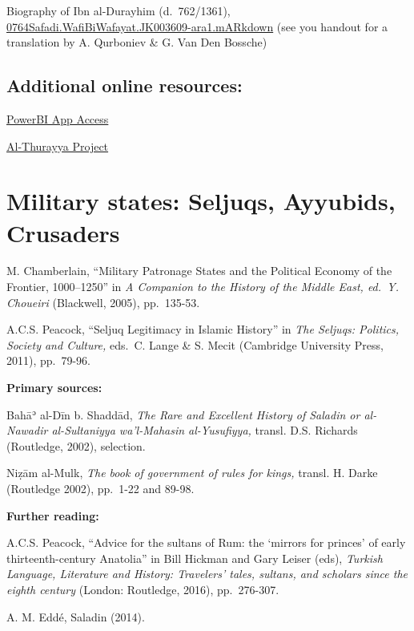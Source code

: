 \documentclass[
]{book}
\begin{document}
Biography of Ibn al-Durayhim (d.~762/1361), \href{https://raw.githubusercontent.com/OpenITI/0775AH/master/data/0764Safadi/0764Safadi.WafiBiWafayat/0764Safadi.WafiBiWafayat.JK003609-ara1.mARkdown}{0764Safadi.WafiBiWafayat.JK003609-ara1.mARkdown} (see you handout for a translation by A. Qurboniev \& G. Van Den Bossche)

\hypertarget{additional-online-resources}{%
\section{Additional online resources:}\label{additional-online-resources}}

\href{https://tinyurl.com/AuthorsArabic}{PowerBI App Access}

\href{https://althurayya.github.io/\#searchPane}{Al-Thurayya Project}

\hypertarget{military-states-seljuqs-ayyubids-crusaders}{%
\chapter{Military states: Seljuqs, Ayyubids, Crusaders}\label{military-states-seljuqs-ayyubids-crusaders}}

M. Chamberlain, ``Military Patronage States and the Political Economy of the Frontier, 1000--1250'' in \emph{A Companion to the History of the Middle East, ed.~Y. Choueiri} (Blackwell, 2005), pp.~135-53.

A.C.S. Peacock, ``Seljuq Legitimacy in Islamic History'' in \emph{The Seljuqs: Politics, Society and Culture,} eds.~C. Lange \& S. Mecit (Cambridge University Press, 2011), pp.~79-96.

\textbf{Primary sources:}

Bahāʾ al-Dīn b. Shaddād, \emph{The Rare and Excellent History of Saladin or al-Nawadir al-Sultaniyya wa'l-Mahasin al-Yusufiyya,} transl. D.S. Richards (Routledge, 2002), selection.

Niẓām al-Mulk, \emph{The book of government of rules for kings,} transl. H. Darke (Routledge 2002), pp.~1-22 and 89-98.

\textbf{Further reading:}

A.C.S. Peacock, ``Advice for the sultans of Rum: the `mirrors for princes' of early thirteenth-century Anatolia'' in Bill Hickman and Gary Leiser (eds), \emph{Turkish Language, Literature and History: Travelers' tales, sultans, and scholars since the eighth century} (London: Routledge, 2016), pp.~276-307.

A. M. Eddé, Saladin (2014).
\end{document}
